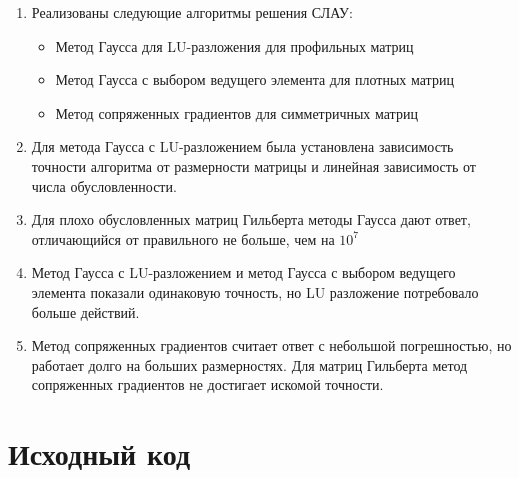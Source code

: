 \begin{enumerate}
	\item Реализованы следующие алгоритмы решения СЛАУ:
	      \begin{itemize}
		      \item Метод Гаусса для LU-разложения для профильных матриц
		      \item Метод Гаусса с выбором ведущего элемента для плотных матриц
		      \item Метод сопряженных градиентов для симметричных матриц
	      \end{itemize}

	\item Для метода Гаусса с LU-разложением была установлена зависимость точности алгоритма от размерности матрицы и линейная зависимость от числа обусловленности.
	\item Для плохо обусловленных матриц Гильберта методы Гаусса дают ответ, отличающийся от правильного не больше, чем на $10^{7}$
	\item Метод Гаусса с LU-разложением и метод Гаусса с выбором ведущего элемента показали одинаковую точность, но LU разложение потребовало больше действий.
	\item Метод сопряженных градиентов считает ответ с небольшой погрешностью, но работает долго на больших размерностях. Для матриц Гильберта метод сопряженных градиентов не достигает искомой точности.
\end{enumerate}

\section{Исходный код}













